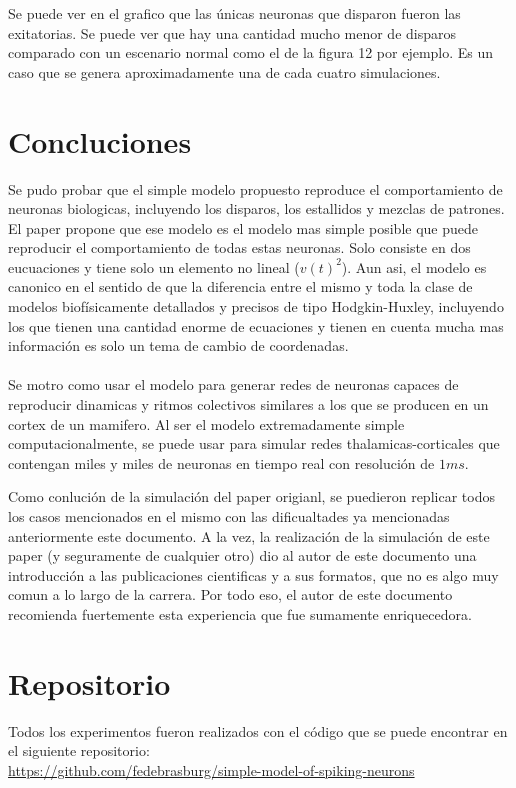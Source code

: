 \documentclass[12pt]{article}
\begin{document}
\newpage

Se puede ver en el grafico que las únicas neuronas que disparon fueron las exitatorias. Se puede ver que hay una cantidad mucho menor de disparos comparado con un escenario normal como el de la figura 12 por ejemplo.
Es un caso que se genera aproximadamente una de cada cuatro simulaciones.

\newpage

\section{Concluciones}

Se pudo probar que el simple modelo propuesto reproduce el comportamiento de neuronas biologicas, incluyendo los disparos, los estallidos y mezclas de patrones. El paper propone que ese modelo es el modelo mas simple posible que puede reproducir el comportamiento de todas estas neuronas.
Solo consiste en dos eucuaciones y tiene solo un elemento no lineal ($v(t)^2$). Aun asi, el modelo es canonico en el sentido de que la diferencia entre el mismo y toda la clase de modelos biofísicamente detallados y precisos de tipo Hodgkin-Huxley, incluyendo los que tienen una cantidad enorme de ecuaciones y tienen en cuenta mucha mas información es solo un tema de cambio de coordenadas. \\ \\

Se motro como usar el modelo para generar redes de neuronas capaces de reproducir dinamicas y ritmos colectivos similares a los que se producen en un cortex de un mamifero.
Al ser el modelo extremadamente simple computacionalmente, se puede usar para simular redes thalamicas-corticales que contengan miles y miles de neuronas en tiempo real con resolución de $1 ms$.

Como conlución de la simulación del paper origianl, se puedieron replicar todos los casos mencionados en el mismo con las dificualtades ya mencionadas anteriormente este documento.
A la vez, la realización de la simulación de este paper (y seguramente de cualquier otro) dio al autor de este documento una introducción a las publicaciones cientificas y a sus formatos, que no es algo muy comun
a lo largo de la carrera. Por todo eso, el autor de este documento recomienda fuertemente esta experiencia que fue sumamente enriquecedora.

\section{Repositorio}
Todos los experimentos fueron realizados con el código que se puede encontrar en el siguiente repositorio: \\
\url{https://github.com/fedebrasburg/simple-model-of-spiking-neurons}
\end{document}

